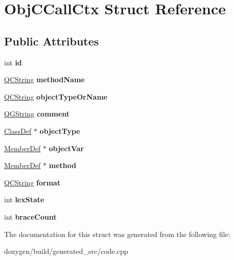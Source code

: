 \hypertarget{struct_obj_c_call_ctx}{}\section{Obj\+C\+Call\+Ctx Struct Reference}
\label{struct_obj_c_call_ctx}
\subsection*{Public Attributes}
\begin{DoxyCompactItemize}
\item 
\mbox{\label{struct_obj_c_call_ctx_a7113c7185e9c8f0748e0bb9aad716b15}} 
int {\bfseries id}
\item 
\mbox{\label{struct_obj_c_call_ctx_a97c3692c9141e5847d45cb7f76e0a59b}} 
\mbox{\hyperlink{class_q_c_string}{Q\+C\+String}} {\bfseries method\+Name}
\item 
\mbox{\label{struct_obj_c_call_ctx_a4ffd01a3580f6fdebef2c91cf801b878}} 
\mbox{\hyperlink{class_q_c_string}{Q\+C\+String}} {\bfseries object\+Type\+Or\+Name}
\item 
\mbox{\label{struct_obj_c_call_ctx_a2b310c492c4947b91e3a12ecb9a44a5b}} 
\mbox{\hyperlink{class_q_g_string}{Q\+G\+String}} {\bfseries comment}
\item 
\mbox{\label{struct_obj_c_call_ctx_ad7d8cfa217a374e1c9bd04b4e56c5116}} 
\mbox{\hyperlink{class_class_def}{Class\+Def}} $\ast$ {\bfseries object\+Type}
\item 
\mbox{\label{struct_obj_c_call_ctx_aa6bf125d3fbb6558b0c8f8f1653044c2}} 
\mbox{\hyperlink{class_member_def}{Member\+Def}} $\ast$ {\bfseries object\+Var}
\item 
\mbox{\label{struct_obj_c_call_ctx_adcd04e96a99de530c229b75ae7a79890}} 
\mbox{\hyperlink{class_member_def}{Member\+Def}} $\ast$ {\bfseries method}
\item 
\mbox{\label{struct_obj_c_call_ctx_ad77bc16112b96dd40ecb41523fc3ef5f}} 
\mbox{\hyperlink{class_q_c_string}{Q\+C\+String}} {\bfseries format}
\item 
\mbox{\label{struct_obj_c_call_ctx_a36959b7ba4f67b82e7613ddecd170fd6}} 
int {\bfseries lex\+State}
\item 
\mbox{\label{struct_obj_c_call_ctx_a22e1388f453f757d56f0c32a01a11783}} 
int {\bfseries brace\+Count}
\end{DoxyCompactItemize}


The documentation for this struct was generated from the following file\+:\begin{DoxyCompactItemize}
\item 
doxygen/build/generated\+\_\+src/code.\+cpp\end{DoxyCompactItemize}
